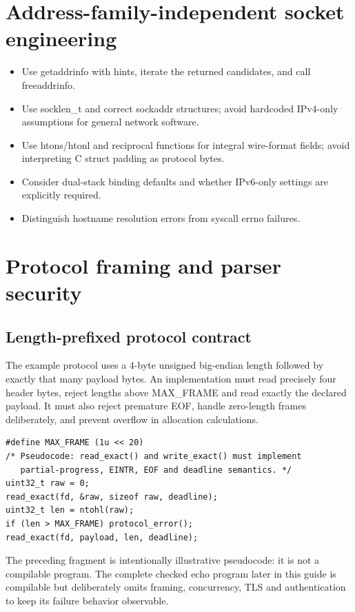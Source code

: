\documentclass[11pt,letterpaper,oneside]{report}
\begin{document}
\chapter{Address-family-independent socket engineering}
\begin{itemize}
\item Use getaddrinfo with hints, iterate the returned candidates, and call freeaddrinfo.
\item Use socklen\_t and correct sockaddr structures; avoid hardcoded IPv4-only assumptions for general network software.
\item Use htons/htonl and reciprocal functions for integral wire-format fields; avoid interpreting C struct padding as protocol bytes.
\item Consider dual-stack binding defaults and whether IPv6-only settings are explicitly required.
\item Distinguish hostname resolution errors from syscall errno failures.
\end{itemize}
\chapter{Protocol framing and parser security}
\section{Length-prefixed protocol contract}
The example protocol uses a 4-byte unsigned big-endian length followed by exactly that many payload bytes. An implementation must read precisely four header bytes, reject lengths above MAX\_FRAME and read exactly the declared payload. It must also reject premature EOF, handle zero-length frames deliberately, and prevent overflow in allocation calculations.

\begin{lstlisting}
#define MAX_FRAME (1u << 20)
/* Pseudocode: read_exact() and write_exact() must implement
   partial-progress, EINTR, EOF and deadline semantics. */
uint32_t raw = 0;
read_exact(fd, &raw, sizeof raw, deadline);
uint32_t len = ntohl(raw);
if (len > MAX_FRAME) protocol_error();
read_exact(fd, payload, len, deadline);
\end{lstlisting}
\begin{engineeringnote}
The preceding fragment is intentionally illustrative pseudocode: it is not a compilable program. The complete checked echo program later in this guide is compilable but deliberately omits framing, concurrency, TLS and authentication to keep its failure behavior observable.
\end{engineeringnote}
\end{document}
